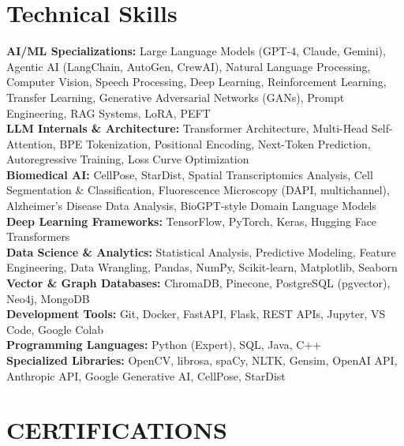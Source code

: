 \documentclass[11pt,a4paper]{article}
\begin{document}


\section*{Technical Skills}

\textbf{AI/ML Specializations:} Large Language Models (GPT-4, Claude, Gemini), Agentic AI (LangChain, AutoGen, CrewAI), Natural Language Processing, Computer Vision, Speech Processing, Deep Learning, Reinforcement Learning, Transfer Learning, Generative Adversarial Networks (GANs), Prompt Engineering, RAG Systems, LoRA, PEFT \\
\textbf{LLM Internals \& Architecture:} Transformer Architecture, Multi-Head Self-Attention, BPE Tokenization, Positional Encoding, Next-Token Prediction, Autoregressive Training, Loss Curve Optimization \\
\textbf{Biomedical AI:} CellPose, StarDist, Spatial Transcriptomics Analysis, Cell Segmentation \& Classification, Fluorescence Microscopy (DAPI, multichannel), Alzheimer's Disease Data Analysis, BioGPT-style Domain Language Models \\
\textbf{Deep Learning Frameworks:} TensorFlow, PyTorch, Keras, Hugging Face Transformers \\
\textbf{Data Science \& Analytics:} Statistical Analysis, Predictive Modeling, Feature Engineering, Data Wrangling, Pandas, NumPy, Scikit-learn, Matplotlib, Seaborn \\
\textbf{Vector \& Graph Databases:} ChromaDB, Pinecone, PostgreSQL (pgvector), Neo4j, MongoDB \\
\textbf{Development Tools:} Git, Docker, FastAPI, Flask, REST APIs, Jupyter, VS Code, Google Colab \\
\textbf{Programming Languages:} Python (Expert), SQL, Java, C++ \\
\textbf{Specialized Libraries:} OpenCV, librosa, spaCy, NLTK, Gensim, OpenAI API, Anthropic API, Google Generative AI, CellPose, StarDist
\vspace{5mm}
\section{CERTIFICATIONS}
\end{document}
